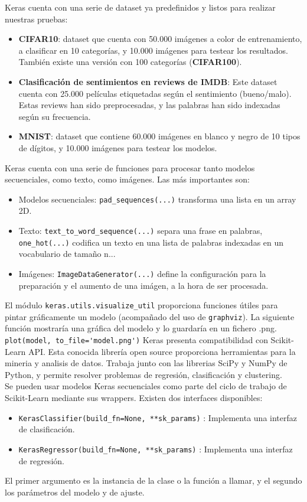 Keras cuenta con una serie de dataset ya predefinidos y listos para realizar nuestras pruebas:
\begin{itemize}
\item \textbf{CIFAR10}: dataset que cuenta con 50.000 imágenes a color de entrenamiento, a clasificar en 10 categorías, y 10.000 imágenes para testear los resultados. También existe una versión con 100 categorías (\textbf{CIFAR100}).
\item \textbf{Clasificación de sentimientos en reviews de IMDB}: Este dataset cuenta con 25.000 películas etiquetadas según el sentimiento (bueno/malo). Estas reviews han sido preprocesadas, y las palabras han sido indexadas según su frecuencia.
\item \textbf{MNIST}: dataset que contiene 60.000 imágenes en blanco y negro de 10 tipos de dígitos, y 10.000 imágenes para testear los modelos.
\end{itemize}

Keras cuenta con una serie de funciones para procesar tanto modelos secuenciales, como texto, como imágenes. Las más importantes son:
\begin{itemize}
\item Modelos secuenciales: \lstinline{pad_sequences(...)} transforma una lista en un array 2D.
\item Texto: \lstinline{text_to_word_sequence(...)} separa una frase en palabras, \lstinline{one_hot(...)} codifica un texto en una lista de palabras indexadas en un vocabulario de tamaño n...
\item Imágenes: \lstinline{ImageDataGenerator(...)} define la configuración para la preparación y el aumento de una imágen, a la hora de ser procesada.
\end{itemize}

El módulo \lstinline{keras.utils.visualize_util} proporciona funciones útiles para pintar gráficamente un modelo (acompañado del uso de \lstinline{graphviz}). La siguiente función mostraría una gráfica del modelo y lo guardaría en un fichero .png.\\
\lstinline{plot(model, to_file='model.png')}
Keras presenta compatibilidad con Scikit-Learn API. Esta conocida librería open source proporciona herramientas para la mineria y analisis de datos. Trabaja junto con las librerias SciPy y NumPy de Python, y permite resolver problemas de regresión, clasificación y clustering.\\
Se pueden usar modelos Keras secuenciales como parte del ciclo de trabajo de Scikit-Learn mediante sus wrappers. Existen dos interfaces disponibles:
\begin{itemize}[noitemsep]
\item \lstinline{KerasClassifier(build_fn=None, **sk_params)} : Implementa una interfaz de clasificación.
\item \lstinline{KerasRegressor(build_fn=None, **sk_params)} : Implementa una interfaz de regresión.
\end{itemize}
El primer argumento es la instancia de la clase o la función a llamar, y el segundo los parámetros del modelo y de ajuste.
